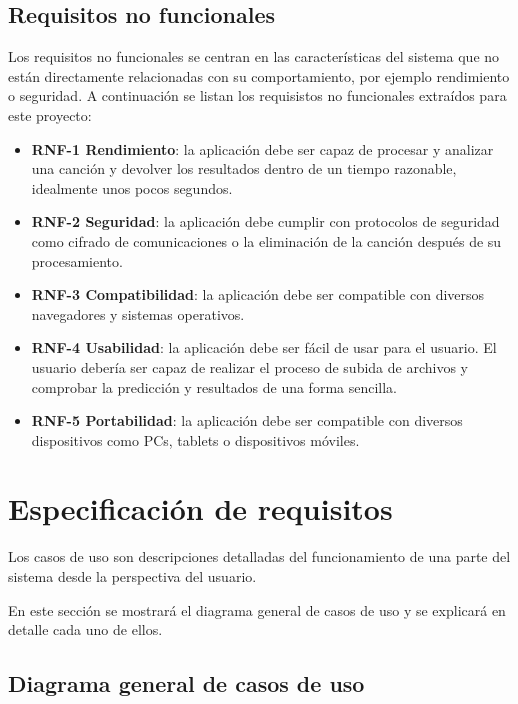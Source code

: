 \subsection{Requisitos no funcionales}

Los requisitos no funcionales se centran en las características del sistema que no están directamente relacionadas con su comportamiento, por ejemplo rendimiento o seguridad. \cite{Blog_2018}
A continuación se listan los requisistos no funcionales extraídos para este proyecto:

\begin{itemize}
\tightlist
\item \textbf{RNF-1 Rendimiento}: la aplicación debe ser capaz de procesar y analizar una canción y devolver los resultados dentro de un tiempo razonable, idealmente unos pocos segundos.

\item \textbf{RNF-2 Seguridad}: la aplicación debe cumplir con protocolos de seguridad como cifrado de comunicaciones o la eliminación de la canción después de su procesamiento.

\item \textbf{RNF-3 Compatibilidad}: la aplicación debe ser compatible con diversos navegadores y sistemas operativos.

\item \textbf{RNF-4 Usabilidad}: la aplicación debe ser fácil de usar para el usuario. El usuario debería ser capaz de realizar el proceso de subida de archivos y comprobar la predicción y resultados de una forma sencilla.

\item \textbf{RNF-5 Portabilidad}: la aplicación debe ser compatible con diversos dispositivos como PCs, tablets o dispositivos móviles.
\end{itemize}

\section{Especificación de requisitos}

Los casos de uso son descripciones detalladas del funcionamiento de una parte del sistema desde la perspectiva del usuario.

En este sección se mostrará el diagrama general de casos de uso y se explicará en detalle cada uno de ellos.

\subsection{Diagrama general de casos de uso}

